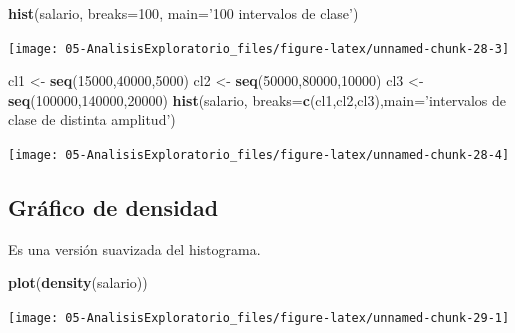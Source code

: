 \documentclass[]{book}
\newenvironment{Shaded}{\begin{snugshade}}{\end{snugshade}}
\newcommand{\KeywordTok}[1]{\textcolor[rgb]{0.13,0.29,0.53}{\textbf{#1}}}
\newcommand{\DataTypeTok}[1]{\textcolor[rgb]{0.13,0.29,0.53}{#1}}
\newcommand{\DecValTok}[1]{\textcolor[rgb]{0.00,0.00,0.81}{#1}}
\newcommand{\StringTok}[1]{\textcolor[rgb]{0.31,0.60,0.02}{#1}}
\newcommand{\NormalTok}[1]{#1}
\begin{document}
\begin{Shaded}
\begin{Highlighting}[]
\KeywordTok{hist}\NormalTok{(salario, }\DataTypeTok{breaks=}\DecValTok{100}\NormalTok{, }\DataTypeTok{main=}\StringTok{'100 intervalos de clase'}\NormalTok{)}
\end{Highlighting}
\end{Shaded}

\begin{center}\texttt{[image: 05-AnalisisExploratorio\_files/figure-latex/unnamed-chunk-28-3]} \end{center}

\begin{Shaded}
\begin{Highlighting}[]
\NormalTok{cl1 <-}\StringTok{ }\KeywordTok{seq}\NormalTok{(}\DecValTok{15000}\NormalTok{,}\DecValTok{40000}\NormalTok{,}\DecValTok{5000}\NormalTok{)}
\NormalTok{cl2 <-}\StringTok{ }\KeywordTok{seq}\NormalTok{(}\DecValTok{50000}\NormalTok{,}\DecValTok{80000}\NormalTok{,}\DecValTok{10000}\NormalTok{)}
\NormalTok{cl3 <-}\StringTok{ }\KeywordTok{seq}\NormalTok{(}\DecValTok{100000}\NormalTok{,}\DecValTok{140000}\NormalTok{,}\DecValTok{20000}\NormalTok{)}
\KeywordTok{hist}\NormalTok{(salario, }\DataTypeTok{breaks=}\KeywordTok{c}\NormalTok{(cl1,cl2,cl3),}\DataTypeTok{main=}\StringTok{'intervalos de clase de distinta amplitud'}\NormalTok{)}
\end{Highlighting}
\end{Shaded}

\begin{center}\texttt{[image: 05-AnalisisExploratorio\_files/figure-latex/unnamed-chunk-28-4]} \end{center}

\subsection{Gráfico de densidad}\label{grafico-de-densidad}

Es una versión suavizada del histograma.

\begin{Shaded}
\begin{Highlighting}[]
\KeywordTok{plot}\NormalTok{(}\KeywordTok{density}\NormalTok{(salario))}
\end{Highlighting}
\end{Shaded}

\begin{center}\texttt{[image: 05-AnalisisExploratorio\_files/figure-latex/unnamed-chunk-29-1]} \end{center}
\end{document}
